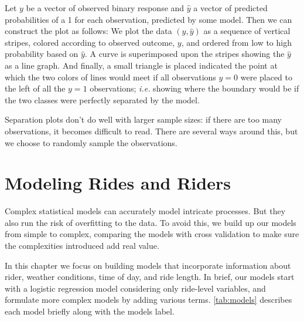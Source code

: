 \documentclass[12pt,twoside]{reedthesis}
\begin{document}
  Let \(y\) be a vector of observed binary response and \(\hat{y}\) a
  vector of predicted probabilities of a 1 for each observation, predicted
  by some model. Then we can construct the plot as follows: We plot the
  data \((y, \hat{y})\) as a sequence of vertical stripes, colored
  according to observed outcome, \(y\), and ordered from low to high
  probability based on \(\hat{y}\). A curve is superimposed upon the
  stripes showing the \(\hat{y}\) as a line graph. And finally, a small
  triangle is placed indicated the point at which the two colors of lines
  would meet if all observations \(y = 0\) were placed to the left of all
  the \(y=1\) observations; \textit{i.e.} showing where the boundary would
  be if the two classes were perfectly separated by the model.
  
  Separation plots don't do well with larger sample sizes: if there are
  too many observations, it becomes difficult to read. There are several
  ways around this, but we choose to randomly sample the observations.
  
  \chapter{Modeling Rides and Riders}\label{model-chapter}
  
  Complex statistical models can accurately model intricate processes. But
  they also run the risk of overfitting to the data. To avoid this, we
  build up our models from simple to complex, comparing the models with
  cross validation to make sure the complexities introduced add real
  value.
  
  In this chapter we focus on building models that incorporate information
  about rider, weather conditions, time of day, and ride length. In brief,
  our models start with a logistic regression model considering only
  ride-level variables, and formulate more complex models by adding
  various terms. \autoref{tab:models} describes each model briefly along
  with the models label.
  
\end{document}
